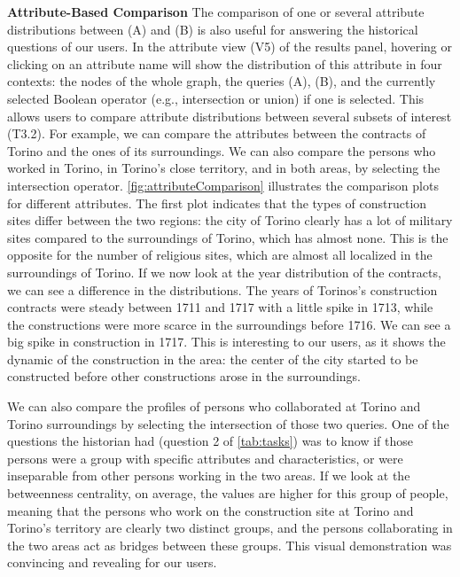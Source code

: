 \noindent\textbf{Attribute-Based Comparison}
The comparison of one or several attribute distributions between (A) and (B) is also useful for answering the historical questions of our users.
In the attribute view (V5) of the results panel, hovering or clicking on an attribute name will show the distribution of this attribute in four contexts: the nodes of the whole graph, the queries (A), (B), and the currently selected Boolean operator (e.g., intersection or union) if one is selected.
This allows users to compare attribute distributions between several subsets of interest (T3.2).
For example, we can compare the attributes between the contracts of Torino and the ones of its surroundings.
We can also compare the persons who worked in Torino, in Torino's close territory, and in both areas, by selecting the intersection operator.
\autoref{fig:attributeComparison} illustrates the comparison plots for different attributes.
The first plot indicates that the types of construction sites differ between the two regions: the city of Torino clearly has a lot of military sites compared to the surroundings of Torino, which has almost none.
This is the opposite for the number of religious sites, which are almost all localized in the surroundings of Torino.
If we now look at the year distribution of the contracts, we can see a difference in the distributions.
The years of Torinos's construction contracts were steady between 1711 and 1717 with a little spike in 1713, while the constructions were more scarce in the surroundings before 1716.
We can see a big spike in construction in 1717.
This is interesting to our users, as it shows the dynamic of the construction in the area: the center of the city started to be constructed before other constructions arose in the surroundings.

We can also compare the profiles of persons who collaborated at Torino and Torino surroundings by selecting the intersection of those two queries.
One of the questions the historian had (question 2 of \autoref{tab:tasks}) was to know if those persons were a group with specific attributes and characteristics, or were inseparable from other persons working in the two areas.
If we look at the betweenness centrality, on average, the values are higher for this group of people, meaning that the persons who work on the construction site at Torino and Torino's territory are clearly two distinct groups, and the persons collaborating in the two areas act as bridges between these groups.
This visual demonstration was convincing and revealing for our users.

